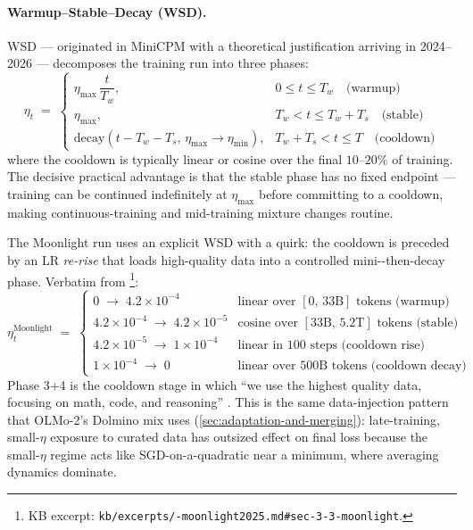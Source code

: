 \paragraph{Warmup--Stable--Decay (WSD).}
WSD --- originated in MiniCPM \citep{phi4} with a
theoretical justification arriving in
2024--2026  --- decomposes the training run into three phases:
\begin{equation}
\eta_t \;=\;
\begin{cases}
\eta_{\max}\,\dfrac{t}{T_w}, & 0 \leq t \leq T_w \quad\text{(warmup)} \\[6pt]
\eta_{\max}, & T_w < t \leq T_w + T_s \quad\text{(stable)} \\[6pt]
\mathrm{decay}(t - T_w - T_s,\, \eta_{\max} \to \eta_{\min}), & T_w + T_s < t \leq T \quad\text{(cooldown)}
\end{cases}
\label{eq:wsd}
\end{equation}
where the cooldown is typically linear or cosine over the final
$10$--$20\%$ of training. The decisive practical advantage is that
the stable phase has no fixed endpoint --- training can be continued
indefinitely at $\eta_{\max}$ before committing to a cooldown,
making continuous-training and mid-training mixture changes routine.

The Moonlight  run uses an explicit WSD with a quirk: the
cooldown is preceded by an LR \emph{re-rise} that loads
high-quality data into a controlled mini--then-decay phase.
Verbatim from \citet[\S
3.3]{muon-moonlight2025}\footnote{KB excerpt:
\texttt{kb/excerpts/-moonlight2025.md\#sec-3-3-moonlight}.}:
\begin{equation}
\eta_t^{\mathrm{Moonlight}} \;=\;
\begin{cases}
0 \;\to\; 4.2 \times 10^{-4} & \text{linear over $[0,\,33\text{B}]$ tokens (warmup)} \\[4pt]
4.2 \times 10^{-4} \;\to\; 4.2 \times 10^{-5} & \text{cosine over $[33\text{B},\,5.2\text{T}]$ tokens (stable)} \\[4pt]
4.2 \times 10^{-5} \;\to\; 1 \times 10^{-4} & \text{linear in 100 steps (cooldown rise)} \\[4pt]
1 \times 10^{-4} \;\to\; 0 & \text{linear over $500$B tokens (cooldown decay)}
\end{cases}
\label{eq:moonlight-schedule}
\end{equation}
Phase 3+4 is the cooldown stage in which ``we use the highest
quality data, focusing on math, code, and reasoning'' \citep[\S
3.3]{muon-moonlight2025}. This is the same data-injection pattern
that OLMo-2's Dolmino mix uses (\cref{sec:adaptation-and-merging}):
late-training, small-$\eta$ exposure to curated data has outsized
effect on final loss because the small-$\eta$ regime acts like
SGD-on-a-quadratic near a minimum, where averaging dynamics dominate.

